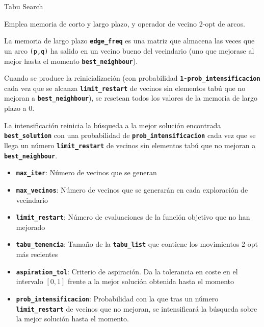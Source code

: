 \documentclass[ignorenonframetext,]{beamer}
\begin{document}
\begin{frame}{Tabu Search}

Emplea memoria de corto y largo plazo, y operador de vecino 2-opt de
arcos.

La memoria de largo plazo \textbf{\texttt{edge\_freq}} es una matriz que
almacena las veces que un arco \texttt{(p,q)} ha salido en un vecino
bueno del vecindario (uno que mejorase al mejor hasta el momento
\textbf{\texttt{best\_neighbour}}).

Cuando se produce la reinicialización (con probabilidad
\textbf{\texttt{1-prob\_intensificacion}} cada vez que se alcanza
\textbf{\texttt{limit\_restart}} de vecinos sin elementos tabú que no
mejoran a \textbf{\texttt{best\_neighbour}}), se resetean todos los
valores de la memoria de largo plazo a 0.

La intensificación reinicia la búsqueda a la mejor solución encontrada
\textbf{\texttt{best\_solution}} con una probabilidad de
\textbf{\texttt{prob\_intensificacion}} cada vez que se llega un número
\textbf{\texttt{limit\_restart}} de vecinos sin elementos tabú que no
mejoran a \textbf{\texttt{best\_neighbour}}.

\begin{itemize}
\item
  \textbf{\texttt{max\_iter}}: Número de vecinos que se generan
\item
  \textbf{\texttt{max\_vecinos}}: Número de vecinos que se generarán en
  cada exploración de vecindario
\item
  \textbf{\texttt{limit\_restart}}: Número de evaluaciones de la función
  objetivo que no han mejorado
\item
  \textbf{\texttt{tabu\_tenencia}}: Tamaño de la
  \textbf{\texttt{tabu\_list}} que contiene los movimientos 2-opt más
  recientes
\item
  \textbf{\texttt{aspiration\_tol}}: Criterio de aspiración. Da la
  tolerancia en coste en el intervalo $[0,1]$ frente a la mejor solución
  obtenida hasta el momento
\item
  \textbf{\texttt{prob\_intensificacion}}: Probabilidad con la que tras
  un número \textbf{\texttt{limit\_restart}} de vecinos que no mejoran,
  se intensificará la búsqueda sobre la mejor solución hasta el momento.
\end{itemize}

\end{frame}
\end{document}
